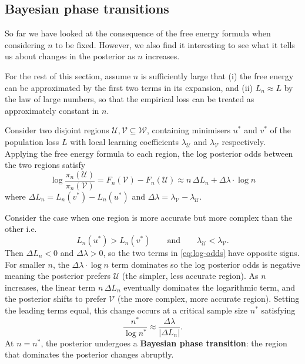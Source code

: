 \documentclass[11pt]{article}
\newcommand{\W}{\mathcal{W}}
\newcommand{\U}{\mathcal{U}}
\newcommand{\V}{\mathcal{V}}
\begin{document}
\subsection{Bayesian phase transitions}

So far we have looked at the consequence of the free energy formula when considering $n$ to be fixed. However, we also find it interesting to see what it tells us about changes in the posterior as $n$ increases. 

For the rest of this section, assume $n$ is sufficiently large that (i) the free energy can be approximated by the first two terms in its expansion, and (ii) $L_n \approx L$ by the law of large numbers, so that the empirical loss can be treated as approximately constant in $n$.

Consider two disjoint regions $\U, \V \subseteq \W$, containing minimisers $u^\ast$ and $v^\ast$ of the population loss $L$ with local learning coefficients $\lambda_{\U}$ and $\lambda_{\V}$ respectively. Applying the free energy formula to each region, the log posterior odds between the two regions satisfy
\begin{equation}
\label{eq:log-odds}
    \log \frac{\pi_n(\U)}{\pi_n(\V)}
    = F_n(\V) - F_n(\U)
    \approx n\,\Delta L_n + \Delta\lambda \cdot \log n
\end{equation}
where $\Delta L_n = L_n(v^\ast) - L_n(u^\ast)$ and $\Delta\lambda = \lambda_{\V} - \lambda_{\U}$.

Consider the case when one region is more accurate but more complex than the other i.e.
\begin{equation*}
    L_n(u^\ast) > L_n(v^\ast)
    \qquad\text{and}\qquad
    \lambda_{\U} < \lambda_{\V}.
\end{equation*}
Then $\Delta L_n < 0$ and $\Delta\lambda > 0$, so the two terms in \eqref{eq:log-odds} have opposite signs. For smaller $n$, the $\Delta\lambda \cdot \log n$ term dominates so the log posterior odds is negative meaning the posterior prefers $\U$ (the simpler, less accurate region). As $n$ increases, the linear term $n\,\Delta L_n$ eventually dominates the logarithmic term, and the posterior shifts to prefer $\V$ (the more complex, more accurate region). Setting the leading terms equal, this change occurs at a critical sample size $n^*$ satisfying
\begin{equation}
\label{eq:critical-n}
    \frac{n^*}{\log n^*} \approx \frac{\Delta\lambda}{\lvert\Delta L_n\rvert}.
\end{equation}
At $n = n^*$, the posterior undergoes a \textbf{Bayesian phase transition}: the region that dominates the posterior changes abruptly. 
\end{document}
